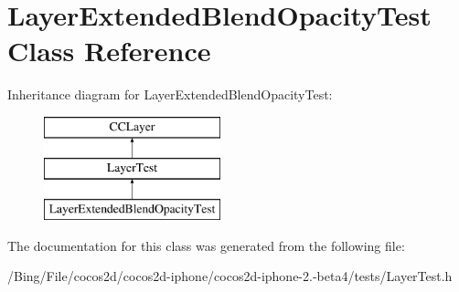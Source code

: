 \hypertarget{interface_layer_extended_blend_opacity_test}{\section{Layer\-Extended\-Blend\-Opacity\-Test Class Reference}
\label{interface_layer_extended_blend_opacity_test}
}
Inheritance diagram for Layer\-Extended\-Blend\-Opacity\-Test\-:\begin{figure}[H]
\begin{center}
\leavevmode
\includegraphics[height=3.000000cm]{interface_layer_extended_blend_opacity_test}
\end{center}
\end{figure}


The documentation for this class was generated from the following file\-:\begin{DoxyCompactItemize}
\item 
/\-Bing/\-File/cocos2d/cocos2d-\/iphone/cocos2d-\/iphone-\/2.-\/beta4/tests/Layer\-Test.\-h\end{DoxyCompactItemize}
